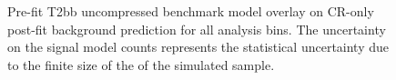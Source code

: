 \begin{figure}[h!]
\begin{center}
{            \label{fig:T2bb_uncompressed_MR_4j}
        } \\
         ~~
         \\
        \caption{
            Pre-fit T2bb uncompressed benchmark model overlay on CR-only
            post-fit background prediction for all analysis bins. The
            uncertainty on the signal model counts represents the statistical
            uncertainty due to the finite size of the of the simulated sample.
        }
        \label{fig:T2bb_uncompressed_MR}
    \end{center}
\end{figure}

